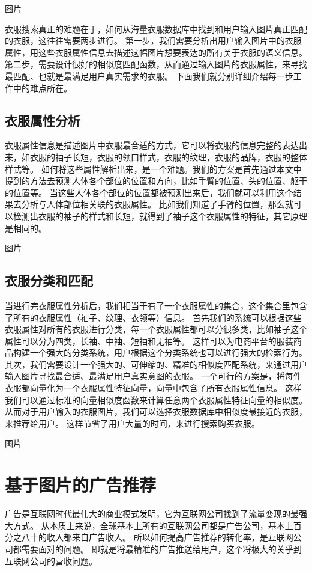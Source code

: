图片

衣服搜索真正的难题在于，如何从海量衣服数据库中找到和用户输入图片真正匹配的衣服，这往往需要两步进行。
第一步，我们需要分析出用户输入图片中的衣服属性，用这些衣服属性信息去描述这幅图片想要表达的所有关于衣服的语义信息。
第二步，需要设计很好的相似度匹配函数，从而通过输入图片的衣服属性，来寻找最匹配、也就是最满足用户真实需求的衣服。
下面我们就分别详细介绍每一步工作中的难点所在。

\subsection{衣服属性分析}
衣服属性信息是描述图片中衣服最合适的方式，它可以将衣服的信息完整的表达出来，如衣服的袖子长短，衣服的领口样式，衣服的纹理，衣服的品牌，衣服的整体样式等。
如何将这些属性解析出来，是一个难题。我们的方案是首先通过本文中提到的方法去预测人体各个部位的位置和方向，比如手臂的位置、头的位置、躯干的位置等。
当这些人体各个部位的位置都被预测出来后，我们就可以利用这个结果去分析与人体部位相关联的衣服属性。
比如我们知道了手臂的位置，那么就可以检测出衣服的袖子的样式和长短，就得到了袖子这个衣服属性的特征，其它原理是相同的。

图片

\subsection{衣服分类和匹配}
当进行完衣服属性分析后，我们相当于有了一个衣服属性的集合，这个集合里包含了所有的衣服属性（袖子、纹理、衣领等）信息。
首先我们的系统可以根据这些衣服属性对所有的衣服进行分类，每一个衣服属性都可以分很多类，比如袖子这个属性可以分为四类，长袖、中袖、短袖和无袖等。
这样可以为电商平台的服装商品构建一个强大的分类系统，用户根据这个分类系统也可以进行强大的检索行为。
其次，我们需要设计一个强大的、可伸缩的、精准的相似度匹配系统，来通过用户输入图片寻找最合适、最满足用户真实意图的衣服。
一个可行的方案是，将每件衣服都向量化为一个衣服属性特征向量，向量中包含了所有衣服属性信息。
这样我们可以通过标准的向量相似度函数来计算任意两个衣服属性特征向量的相似度。
从而对于用户输入的衣服图片，我们可以选择衣服数据库中相似度最接近的衣服，来推荐给用户。
这样节省了用户大量的时间，来进行搜索购买衣服。

图片

\section{基于图片的广告推荐}
广告是互联网时代最伟大的商业模式发明，它为互联网公司找到了流量变现的最强大方式。
从本质上来说，全球基本上所有的互联网公司都是广告公司，基本上百分之八十的收入都来自广告收入。
所以如何提高广告推荐的转化率，是互联网公司都需要面对的问题。
即就是将最精准的广告推送给用户，这个将极大的关乎到互联网公司的营收问题。

